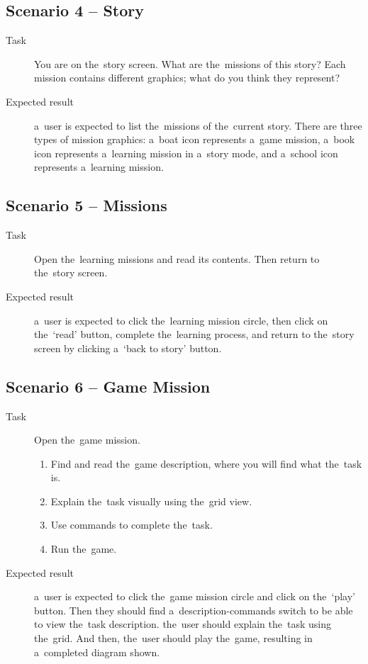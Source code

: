 \subsection*{Scenario 4 -- Story}

\begin{description}
    \item[Task] You are on the~story screen.
    What are the~missions of this story?
    Each mission contains different graphics; what do you think they represent?
    \item[Expected result] a~user is expected to list the~missions of the~current story.
    There are three types of mission graphics: a~boat icon represents a~game mission, a~book icon represents a~learning mission in a~story mode, and a~school icon represents a~learning mission.
\end{description}

\subsection*{Scenario 5 -- Missions}

\begin{description}
    \item[Task] Open the~learning missions and read its contents.
    Then return to the~story screen.
    \item[Expected result] a~user is expected to click the~learning mission circle, then click on the~\enquote*{read} button, complete the~learning process, and return to the~story screen by clicking a~\enquote*{back to story} button.
\end{description}

\subsection*{Scenario 6 -- Game Mission}

\begin{description}
    \item[Task] Open the~game mission.
    \begin{enumerate}
        \item Find and read the~game description, where you will find what the~task is.
        \item Explain the~task visually using the~grid view.
        \item Use commands to complete the~task.
        \item Run the~game.
    \end{enumerate}
    \item[Expected result] a~user is expected to click the~game mission circle and click on the~\enquote*{play} button.
    Then they should find a~description-commands switch to be able to view the~task description.
    the~user should explain the~task using the~grid.
    And then, the~user should play the~game, resulting in a~completed diagram shown.
\end{description}

